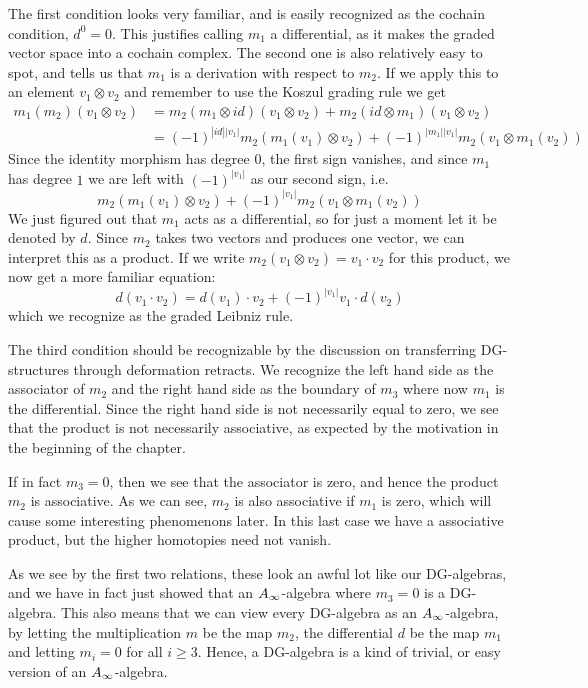 The first condition looks very familiar, and is easily recognized as the cochain condition, $d^0=0$. This justifies calling $m_1$ a differential, as it makes the graded vector space into a cochain complex. The second one is also relatively easy to spot, and tells us that $m_1$ is a derivation with respect to $m_2$. If we apply this to an element $v_1\otimes v_2$ and remember to use the Koszul grading rule we get 
\begin{align*}
    m_1(m_2)(v_1 \otimes v_2) 
    &= m_2(m_1\otimes id)(v_1\otimes v_2) + m_2(id\otimes m_1)(v_1\otimes v_2) \\
    &= (-1)^{|id||v_1|}m_2(m_1(v_1)\otimes v_2) + (-1)^{|m_1||v_1|}m_2(v_1\otimes m_1(v_2))
\end{align*}
Since the identity morphism has degree $0$, the first sign vanishes, and since $m_1$ has degree $1$ we are left with $(-1)^{|v_1|}$ as our second sign, i.e.
\begin{equation*}
    m_2(m_1(v_1)\otimes v_2) + (-1)^{|v_1|}m_2(v_1\otimes m_1(v_2))
\end{equation*}
We just figured out that $m_1$ acts as a differential, so for just a moment let it be denoted by $d$. Since $m_2$ takes two vectors and produces one vector, we can interpret this as a product. If we write $m_2(v_1\otimes v_2)=v_1\cdot v_2$ for this product, we now get a more familiar equation:
\begin{equation*}
    d(v_1\cdot v_2) = d(v_1)\cdot v_2 + (-1)^{|v_1|}v_1\cdot d(v_2)
\end{equation*}
which we recognize as the graded Leibniz rule. 

The third condition should be recognizable by the discussion on transferring DG-structures through deformation retracts. We recognize the left hand side as the associator of $m_2$ and the right hand side as the boundary of $m_3$ where now $m_1$ is the differential. Since the right hand side is not necessarily equal to zero, we see that the product is not necessarily associative, as expected by the motivation in the beginning of the chapter. 

If in fact $m_3 = 0$, then we see that the associator is zero, and hence the product $m_2$ is associative.  As we can see, $m_2$ is also associative if $m_1$ is zero, which will cause some interesting phenomenons later. In this last case we have a associative product, but the higher homotopies need not vanish. 

As we see by the first two relations, these look an awful lot like our DG-algebras, and we have in fact just showed that an $A_{\infty}$-algebra where $m_3 = 0$ is a DG-algebra. This also means that we can view every DG-algebra as an $A_{\infty}$-algebra, by letting the multiplication $m$ be the map $m_2$, the differential $d$ be the map $m_1$ and letting $m_i=0$ for all $i\geq 3$. Hence, a DG-algebra is a kind of trivial, or easy version of an $A_{\infty}$-algebra. 


